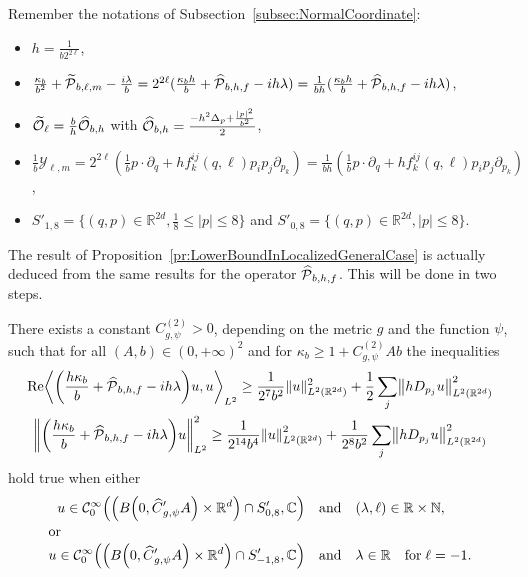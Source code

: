 \documentclass[AHL,Unicode,longabstracts]{cedram}
\newcommand{\C}{\mathbb{C}}
\newcommand{\R}{\mathbb{R}}
\newcommand{\N}{\mathbb{N}}
\newcommand{\clC}{\mathcal{C}}
\newcommand{\clY}{\mathcal{Y}}
\newcommand{\clO}{\mathcal{O}}
\newcommand{\clP}{\mathcal{P}}
\DeclareMathOperator{\Ree}{Re}
\let\oldtilde\tilde
\renewcommand*{\tilde}[1]{\mathchoice{\widetilde{#1}}{\widetilde{#1}}{\oldtilde{#1}}{\oldtilde{#1}}}
\let\oldhat\hat
\renewcommand*{\hat}[1]{\mathchoice{\widehat{#1}}{\widehat{#1}}{\oldhat{#1}}{\oldhat{#1}}}
\let\originalleft\left
\let\originalright\right
\renewcommand{\left}{\mathopen{}\mathclose\bgroup\originalleft}
\renewcommand{\right}{\aftergroup\egroup\originalright}
\newcounter{setofstep}
\newcounter{step}[setofstep]
\begin{document}
Remember the notations of Subsection~\ref{subsec:NormalCoordinate}:
\begin{itemize}
\item $h=\frac{1}{b2^{2\ell}}$,
\item $\frac{\kappa_{b}}{b^{2}} + \tilde{\clP}_{b,\ell,m} - \frac{i\lambda}{b}= 2^{2\ell}
(\frac{\kappa_{b}h}{b} + \hat{\clP}_{b,h,f} - i h \lambda)=\frac{1}{bh}(\frac{\kappa_{b}h}{b} + \hat{\clP}_{b,h,f} - i h \lambda)$, 
\item $\tilde{\clO}_{\ell}=\frac{b}{h}\hat{\clO}_{b,h}$ with $\hat{\clO}_{b,h}=\frac{-h^2\Delta_p+\frac{|p|^2}{b^2}}{2}$,
\item $\frac{1}{b}\clY_{\ell,m}=2^{2\ell}(\frac{1}{b}p\cdot \partial_q +hf^{ij}_{k}(q,\ell)p_i p_j\partial_{p_k})=\frac{1}{bh}(\frac{1}{b}p\cdot \partial_q +hf^{ij}_{k}(q,\ell)p_i p_j\partial_{p_k})$,
\item $S'_{1,8}=\{(q,p)\in\R^{2d}, \frac{1}{8}\leq |p|\leq 8\}$ and $S'_{0,8}=\{(q,p)\in\R^{2d}, |p|\leq 8\}$.
\end{itemize}
The result of Proposition~\ref{pr:LowerBoundInLocalizedGeneralCase} is actually deduced from the same results for the operator $\hat{\clP}_{b,h,f}$. This will be done in two steps.

\begin{prop}\label{proposition:RefinedIntegrationByPart}
There exists a constant $C_{g,\psi}^{(2)}>0$, depending on the metric $g$ and the function $\psi$, such that for all $(A,b)\in (0,+\infty)^2$ and for $\kappa_b \geq 1+C_{g,\psi}^{(2)}Ab$ the inequalities
\begin{gather}
\Ree \left\langle \left(\frac{h\kappa_b}{b} + \hat{\clP}_{b,h,f} - ih\lambda \right) u, u \right\rangle_{L^2} \geq \frac{1}{2^7 b^2} \|u\|_{L^2(\R^{2d})}^2 + \frac{1}{2} \sum_j\left\|hD_{p_j}u \right\|_{L^2(\R^{2d})}^2
\label{eq:IPPPbhf}
\\
\left\| \left(\frac{h \kappa_{b}}{b} + \hat{\clP}_{b,h,f} -i h\lambda \right) u \right\|_{L^2}^{2} \geq \frac{1}{2^{14} b^4} \left\| u \right\|_{L^2(\R^{2d})}^{2} + \frac{1}{2^8 b^2} \sum_j \left\| hD_{p_{j}}u \right\|_{L^2(\R^{2d})}^{2}\label{eq:RefinedIppeq}
\end{gather}
hold true
when either
\begin{align*}
u \in \clC^\infty_0\left(\left(B\left(0,\hat{C}'_{g,\psi}A\right)\times \R^d\right)\cap S_{0,8}',\C\right)\quad&\text{and}\quad (\lambda,\ell)\in \R\times \N,\\
\intertext{or}
u \in \clC^\infty_0\left(\left(B\left(0,\hat{C}'_{g,\psi}A\right)\times \R^d\right)\cap S_{-1,8}',\C\right)\quad &\text{and}\quad \lambda\in \R\quad\text{for}\; \ell=-1.
\end{align*}
\end{prop}
\end{document}
